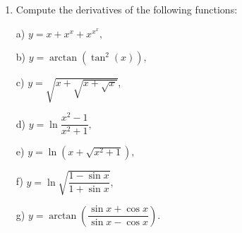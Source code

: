 \documentclass[11pt]{article}
\renewcommand{\_}[1]{\underline{ #1 }}
\theoremstyle{definition}
\numberwithin{equation}{subsection}
\begin{document}
\begin{enumerate}
\item  Compute the derivatives of the following functions:

a) $y=x+x^x+x^{x^x},$


b) $y=\arctan(\tan^2(x)),$

c) $y=\sqrt{x+\sqrt{x+\sqrt{x}}},$

d) $y=\ln{\dfrac{x^2-1}{x^2+1}},$

e) $y=\ln{(x+\sqrt{x^2+1})},$

f) $y=\ln{\sqrt{\dfrac{1-\sin{x}}{1+\sin{x}}}},$

g) $y=\arctan{\left ( \dfrac{\sin{x}+\cos{x}}{\sin{x}-\cos{x}} \right )}.$
\end{enumerate}
\end{document}
